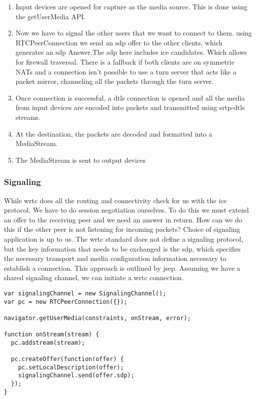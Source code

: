 \begin{enumerate}
\item Input devices are opened for capture as the media source. This is done using the getUserMedia API.
\item Now we have to signal the other users that we want to connect to them. using RTCPeerConnection we send an \gls{sdp} offer to the other clients, which generates an \gls{sdp} Answer.The \gls{sdp} here includes \gls{ice} candidates. Which allows for firewall traversal. There is a fallback if both clients are on symmetric NATs and a connection isn't possible to use a \gls{turn} server that acts like a packet mirror, channeling all the packets through the \gls{turn} server.
\item Once connection is successful, a \gls{dtls} connection is opened and all the media from input devices are encoded into packets and transmitted using \gls{srtp}-\gls{dtls} streams.
\item At the destination, the packets are decoded and formatted into a MediaStream.
\item The MediaStream is sent to output devices
\end{enumerate}


\subsubsection{Signaling}
While \gls{wrtc} does all the routing and connectivity check for us with the \gls{ice} protocol. We have to do session negotiation ourselves. To do this we must extend an offer to the receiving peer and we need an answer in return. How can we do this if the other peer is not listening for incoming packets? Choice of signaling application is up to us. The \gls{wrtc} standard does not define a signaling protocol, but the key information that needs to be exchanged is the \gls{sdp}, which specifies the necessary transport and media configuration information necessary to establish a connection. This approach is outlined by \gls{jsep}. Assuming we have a shared signaling channel, we can initiate a \gls{wrtc} connection.

\begin{lstlisting}
var signalingChannel = new SignalingChannel();
var pc = new RTCPeerConnection({});

navigator.getUserMedia(constraints, onStream, error);

function onStream(stream) {
  pc.addstream(stream);

  pc.createOffer(function(offer) {
    pc.setLocalDescription(offer);
    signalingChannel.send(offer.sdp);
  });
}
\end{lstlisting}


